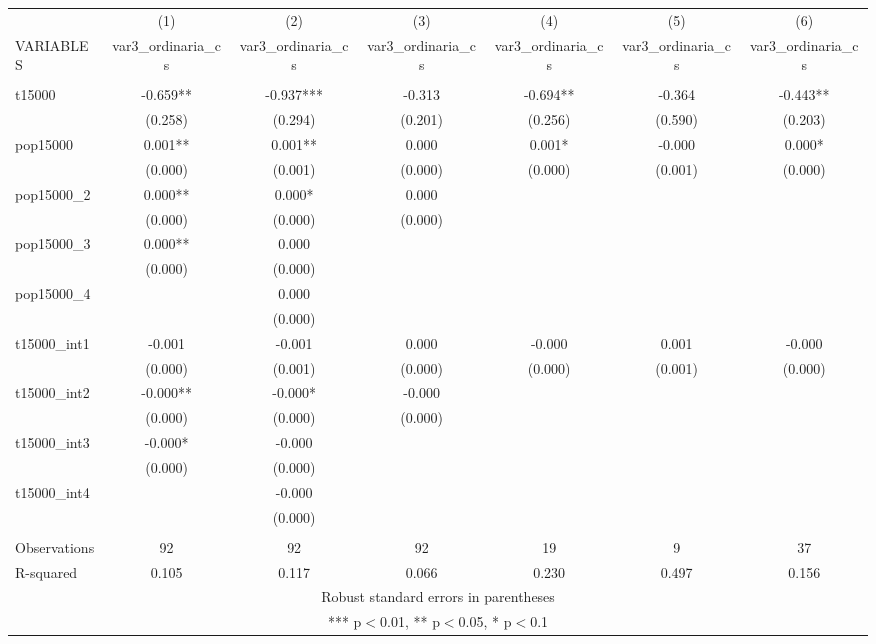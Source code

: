 \documentclass[]{article}
\begin{document}
\begin{tabular}{lcccccc} \hline
 & (1) & (2) & (3) & (4) & (5) & (6) \\
VARIABLES & var3\_ordinaria\_cs & var3\_ordinaria\_cs & var3\_ordinaria\_cs & var3\_ordinaria\_cs & var3\_ordinaria\_cs & var3\_ordinaria\_cs \\ \hline
 &  &  &  &  &  &  \\
t15000 & -0.659** & -0.937*** & -0.313 & -0.694** & -0.364 & -0.443** \\
 & (0.258) & (0.294) & (0.201) & (0.256) & (0.590) & (0.203) \\
pop15000 & 0.001** & 0.001** & 0.000 & 0.001* & -0.000 & 0.000* \\
 & (0.000) & (0.001) & (0.000) & (0.000) & (0.001) & (0.000) \\
pop15000\_2 & 0.000** & 0.000* & 0.000 &  &  &  \\
 & (0.000) & (0.000) & (0.000) &  &  &  \\
pop15000\_3 & 0.000** & 0.000 &  &  &  &  \\
 & (0.000) & (0.000) &  &  &  &  \\
pop15000\_4 &  & 0.000 &  &  &  &  \\
 &  & (0.000) &  &  &  &  \\
t15000\_int1 & -0.001 & -0.001 & 0.000 & -0.000 & 0.001 & -0.000 \\
 & (0.000) & (0.001) & (0.000) & (0.000) & (0.001) & (0.000) \\
t15000\_int2 & -0.000** & -0.000* & -0.000 &  &  &  \\
 & (0.000) & (0.000) & (0.000) &  &  &  \\
t15000\_int3 & -0.000* & -0.000 &  &  &  &  \\
 & (0.000) & (0.000) &  &  &  &  \\
t15000\_int4 &  & -0.000 &  &  &  &  \\
 &  & (0.000) &  &  &  &  \\
 &  &  &  &  &  &  \\
Observations & 92 & 92 & 92 & 19 & 9 & 37 \\
 R-squared & 0.105 & 0.117 & 0.066 & 0.230 & 0.497 & 0.156 \\ \hline
\multicolumn{7}{c}{ Robust standard errors in parentheses} \\
\multicolumn{7}{c}{ *** p$<$0.01, ** p$<$0.05, * p$<$0.1} \\
\end{tabular}
\end{document}

